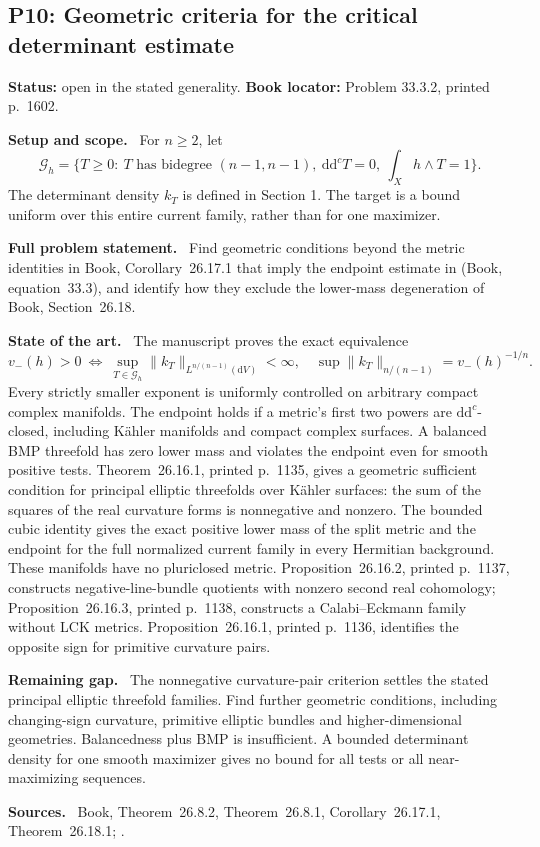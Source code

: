 \documentclass[11pt]{article}
\newcommand{\ddc}{\mathrm d\mathrm d^c}
\newcommand{\field}[1]{\par\medskip\noindent\textbf{#1.}\ }
\begin{document}
\subsection{P10: Geometric criteria for the critical determinant estimate}
\label{P10}
\noindent\textbf{Status:} open in the stated generality. \textbf{Book locator:} Problem 33.3.2, printed p.~1602.
\field{Setup and scope} For $n\geq2$, let
\[\mathscr G_h=\{T\geq0:\ T\text{ has bidegree }(n-1,n-1),\ \ddc T=0,\ \int_Xh\wedge T=1\}.\]
The determinant density $k_T$ is defined in Section 1. The target is a bound uniform over this entire current family, rather than for one maximizer.
\field{Full problem statement} Find geometric conditions beyond the metric identities in Book, Corollary~26.17.1 that imply the endpoint estimate in (Book, equation~33.3), and identify how they exclude the lower-mass degeneration of Book, Section~26.18.
\field{State of the art} The manuscript proves the exact equivalence
\[v_-(h)>0\ \Longleftrightarrow\ \sup_{T\in\mathscr G_h}\|k_T\|_{L^{n/(n-1)}(\mathrm dV)}<\infty,\quad
 \sup\|k_T\|_{n/(n-1)}=v_-(h)^{-1/n}.\]
Every strictly smaller exponent is uniformly controlled on arbitrary compact complex manifolds. The endpoint holds if a metric's first two powers are $\ddc$-closed, including K\"ahler manifolds and compact complex surfaces. A balanced BMP threefold has zero lower mass and violates the endpoint even for smooth positive tests. Theorem~26.16.1, printed p.~1135, gives a geometric sufficient condition for principal elliptic threefolds over K\"ahler surfaces: the sum of the squares of the real curvature forms is nonnegative and nonzero. The bounded cubic identity gives the exact positive lower mass of the split metric and the endpoint for the full normalized current family in every Hermitian background. These manifolds have no pluriclosed metric. Proposition~26.16.2, printed p.~1137, constructs negative-line-bundle quotients with nonzero second real cohomology; Proposition~26.16.3, printed p.~1138, constructs a Calabi--Eckmann family without LCK metrics. Proposition~26.16.1, printed p.~1136, identifies the opposite sign for primitive curvature pairs.
\field{Remaining gap} The nonnegative curvature-pair criterion settles the stated principal elliptic threefold families. Find further geometric conditions, including changing-sign curvature, primitive elliptic bundles and higher-dimensional geometries. Balancedness plus BMP is insufficient. A bounded determinant density for one smooth maximizer gives no bound for all tests or all near-maximizing sequences.
\field{Sources} Book, Theorem~26.8.2, Theorem~26.8.1, Corollary~26.17.1, Theorem~26.18.1; \cite{GL22}.
\end{document}
